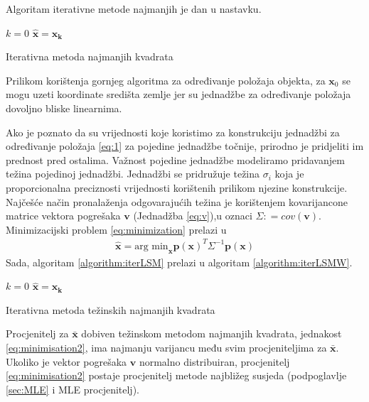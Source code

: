 \documentclass[a4paper,twoside,12pt]{memoir} %
\begin{document}
Algoritam iterativne metode najmanjih je dan u nastavku.

\begin{algorithm}[H]
	$k = 0$ \;
	$\hat{\mathbf{x}} = \mathbf{x_k}$
\caption{Iterativna metoda najmanjih kvadrata}
\label{algorithm:iterLSM}
\end{algorithm}

Prilikom korištenja gornjeg algoritma za određivanje položaja objekta, za $\mathbf{x}_0$ se mogu uzeti koordinate središta zemlje jer su jednadžbe za određivanje položaja dovoljno bliske linearnima.

Ako je poznato da su vrijednosti koje koristimo za konstrukciju
jednadžbi za određivanje položaja \ref{eq:1} za pojedine jednadžbe točnije,
prirodno je pridjeliti im prednost pred ostalima.
Važnost pojedine jednadžbe modeliramo pridavanjem težina pojedinoj jednadžbi.
Jednadžbi se pridružuje težina $\sigma_i$ koja je proporcionalna preciznosti 
vrijednosti korištenih prilikom njezine konstrukcije.
Najčešće način pronalaženja odgovarajućih težina je
korištenjem kovarijancone matrice
vektora pogrešaka $\mathbf{v}$ (Jednadžba \ref{eq:v}),u oznaci $\Sigma : = cov(\mathbf{v})$. Minimizacijski problem \ref{eq:minimization} prelazi u %
\begin{align}\label{eq:minimisation2}
\hat{\mathbf{x}} = \text{arg min}_\mathbf{x} \mathbf{p}(\mathbf{x})^T \Sigma^{-1} \mathbf{p}(\mathbf{x})
\end{align}%
Sada, algoritam \ref{algorithm:iterLSM} prelazi u algoritam \ref{algorithm:iterLSMW}.

\begin{algorithm}[H]
	$k = 0$ \;
	$\hat{\mathbf{x}} = \mathbf{x_k}$
	\caption{Iterativna metoda težinskih najmanjih kvadrata}
	\label{algorithm:iterLSMW}
\end{algorithm}
Procjenitelj za $\bar{\mathbf{x}}$ dobiven težinskom metodom najmanjih kvadrata, jednakost \ref{eq:minimisation2}, ima najmanju varijancu među svim procjeniteljima za
$\bar{\mathbf{x}}$. Ukoliko je vektor pogrešaka $\mathbf{v}$ normalno
distribuiran, procjenitelj \ref{eq:minimisation2} postaje procjenitelj
metode najbližeg susjeda (podpoglavlje \ref{sec:MLE} i MLE procjenitelj).
\end{document}
